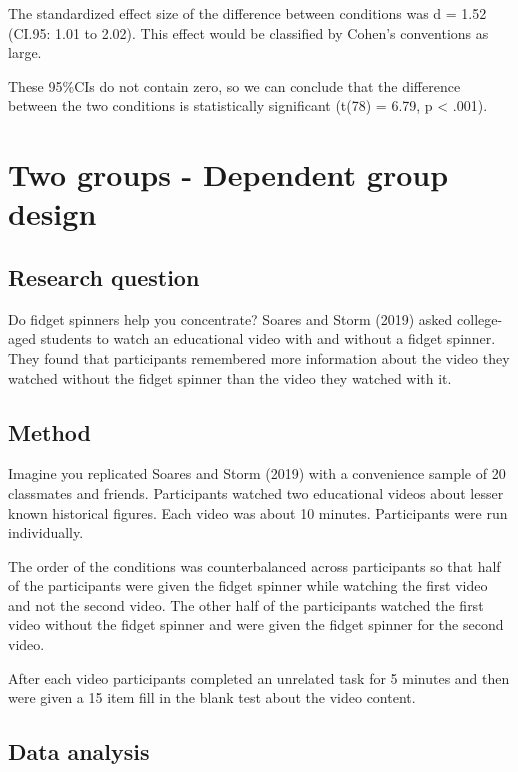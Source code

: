 \documentclass[
]{book}
\begin{document}
The standardized effect size of the difference between conditions was d = 1.52 (CI.95: 1.01 to 2.02). This effect would be classified by Cohen's conventions as large.

These 95\%CIs do not contain zero, so we can conclude that the difference between the two conditions is statistically significant (t(78) = 6.79, p \textless{} .001).

\hypertarget{two-groups---dependent-group-design}{%
\section{Two groups - Dependent group design}\label{two-groups---dependent-group-design}}

\hypertarget{research-question-1}{%
\subsection{Research question}\label{research-question-1}}

Do fidget spinners help you concentrate? Soares and Storm (2019) asked college-aged students to watch an educational video with and without a fidget spinner. They found that participants remembered more information about the video they watched without the fidget spinner than the video they watched with it.

\hypertarget{method-1}{%
\subsection{Method}\label{method-1}}

Imagine you replicated Soares and Storm (2019) with a convenience sample of 20 classmates and friends. Participants watched two educational videos about lesser known historical figures. Each video was about 10 minutes. Participants were run individually.

The order of the conditions was counterbalanced across participants so that half of the participants were given the fidget spinner while watching the first video and not the second video. The other half of the participants watched the first video without the fidget spinner and were given the fidget spinner for the second video.

After each video participants completed an unrelated task for 5 minutes and then were given a 15 item fill in the blank test about the video content.

\hypertarget{data-analysis-1}{%
\subsection{Data analysis}\label{data-analysis-1}}
\end{document}
